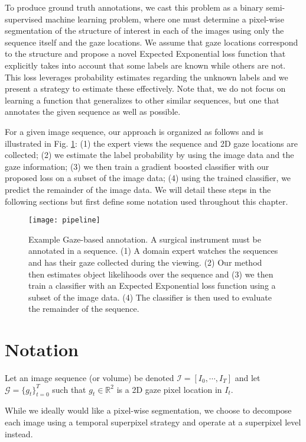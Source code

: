 To produce ground truth annotations, we cast this problem as a binary semi-supervised
machine learning problem, where one must determine a pixel-wise segmentation of the structure of interest in each of the images using only the sequence itself and the gaze locations.
We assume that gaze locations correspond to the structure and propose a novel Expected Exponential loss function that explicitly takes into account that some labels are known while others are not.
This loss leverages probability estimates regarding the unknown labels and we present a strategy to estimate these effectively.
Note that, we do not focus on learning a function that generalizes to other similar sequences, but one that annotates the given sequence as well as possible.

For a given image sequence, our approach is organized as follows and is illustrated in Fig. \ref{fig:eel_pipeline}:
(1) the expert views the sequence and 2D gaze locations are collected; (2) we estimate the label
probability by using the image data and the gaze information; (3) we then train a gradient
boosted classifier with our proposed loss on a subset of the image data; (4) using the trained
classifier, we predict the remainder of the image data. We will detail these steps in the following
sections but first define some notation used throughout this chapter.

\begin{figure}[h]
\texttt{[image: pipeline]}
\caption{Example Gaze-based annotation.
  A surgical instrument must be annotated in a sequence.
  (1) A domain expert watches the sequences and has their gaze collected during the
  viewing.
  (2) Our method then estimates object likelihoods over the sequence and (3) we then
train a classifier with an Expected Exponential loss function using a subset of the image data.
(4) The classifier is then used to evaluate the remainder of the sequence.}
\label{fig:eel_pipeline}
\end{figure}

\section{Notation}
Let an image sequence (or volume) be denoted $\mathcal{I} = [I_{0}, \cdots , I_{T}]$ and let $\mathcal{G} = \{g_{t} \}^{T}_{t=0}$ such that $g_t\in \mathbb{R}^{2}$ is a 2D gaze pixel location in $I_{t}$.

While we ideally would like
a pixel-wise segmentation, we choose to decompose each image using a temporal superpixel
strategy \cite{chang13} and operate at a superpixel level instead.

